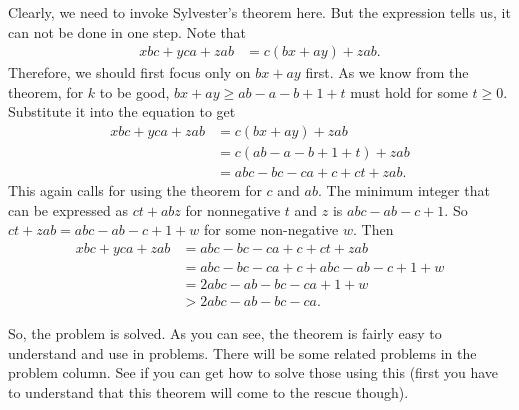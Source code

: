 \documentclass{subfile}
\begin{document}
	\begin{solution}
		Clearly, we need to invoke Sylvester's theorem here. But the expression tells us, it can not be done in one step. Note that
			\begin{align*}
				xbc+yca+zab & = c(bx+ay)+zab.
			\end{align*}
		Therefore, we should first focus only on $bx+ay$ first. As we know from the theorem, for $k$ to be good, $bx+ay\geq ab-a-b+1+t$ must hold for some $t\geq0$. Substitute it into the equation to get
			\begin{align*}
				xbc+yca+zab & = c(bx+ay)+zab\\
							& = c(ab-a-b+1+t)+zab\\
							& = abc-bc-ca+c+ct+zab.
			\end{align*}
		This again calls for using the theorem for $c$ and $ab$. The minimum integer that can be expressed as $ct+abz$ for nonnegative $t$ and $z$ is $abc-ab-c+1$. So $ct+zab=abc-ab-c+1+w$ for some non-negative $w$. Then
			\begin{align*}
				xbc+yca+zab & = abc-bc-ca+c+ct+zab\\
							& = abc-bc-ca+c+abc-ab-c+1+w\\
							& = 2abc-ab-bc-ca+1+w\\
							& > 2abc-ab-bc-ca.
			\end{align*}
	\end{solution}
So, the problem is solved. As you can see, the theorem is fairly easy to understand and use in problems. There will be some related problems in the problem column. See if you can get how to solve those using this (first you have to understand that this theorem will come to the rescue though).
\end{document}
